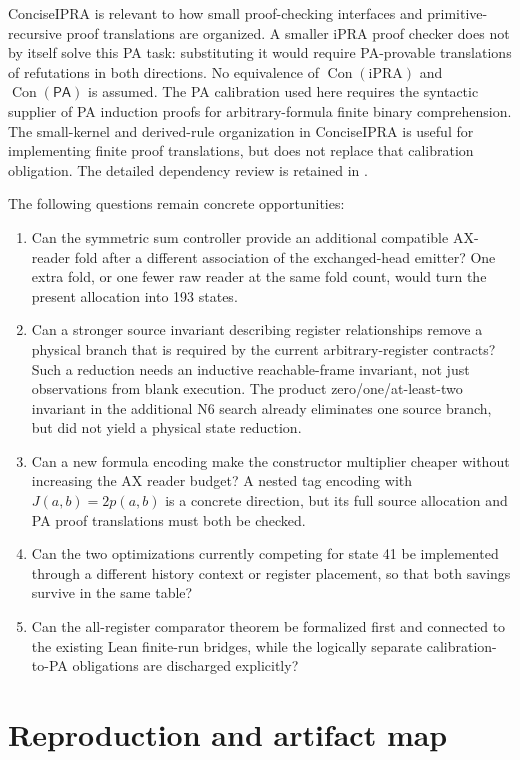 \documentclass[11pt,letterpaper]{article}
\newcommand{\PA}{\mathsf{PA}}
\newcommand{\Con}{\operatorname{Con}}
\newcommand{\file}[1]{\path{#1}}
\begin{document}
ConciseIPRA is relevant to how small proof-checking interfaces and
primitive-recursive proof translations are organized. A smaller iPRA
proof checker does not by itself solve this PA task: substituting it
would require PA-provable translations of refutations in both directions.
No equivalence of $\Con(\mathrm{iPRA})$ and $\Con(\PA)$ is assumed.
The PA calibration used here requires the syntactic supplier of PA
induction proofs for arbitrary-formula finite binary comprehension.
The small-kernel and derived-rule organization in ConciseIPRA is useful
for implementing finite proof translations, but does not replace that
calibration obligation. The detailed dependency review is retained in
\file{references/calibration_audit.txt}.

The following questions remain concrete opportunities:
\begin{enumerate}
 \item Can the symmetric sum controller provide an additional compatible
 AX-reader fold after a different association of the exchanged-head
 emitter? One extra fold, or one fewer raw reader at the same fold count,
 would turn the present allocation into 193 states.
 \item Can a stronger source invariant describing register relationships
 remove a physical branch that is required by the current arbitrary-register
 contracts? Such a reduction needs an inductive reachable-frame invariant,
 not just observations from blank execution. The product zero/one/at-least-two
 invariant in the additional N6 search already eliminates one source
 branch, but did not yield a physical state reduction.
 \item Can a new formula encoding make the constructor multiplier cheaper
 without increasing the AX reader budget? A nested tag encoding with
 $J(a,b)=2p(a,b)$ is a concrete direction, but its full source allocation
 and PA proof translations must both be checked.
 \item Can the two optimizations currently competing for state 41 be
 implemented through a different history context or register placement,
 so that both savings survive in the same table?
 \item Can the all-register comparator theorem be formalized first and
 connected to the existing Lean finite-run bridges, while the logically
 separate calibration-to-PA obligations are discharged explicitly?
\end{enumerate}

\section{Reproduction and artifact map}
\end{document}
